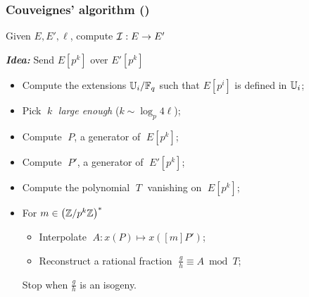 \documentclass[10pt,usepdftitle=false]{beamer}
\begin{document}

\begin{frame}
  \frametitle{Couveignes' algorithm (\cite{couveignes96})}
  
  \begin{center}
    \large
    Given $E, E', \ell$, compute $\mathcal{I}:E\to E'$
  \end{center}

  \begin{center}
    \emph{\textbf{Idea:}} Send $E[p^k]$ over $E'[p^k]$
  \end{center}
  
  \begin{itemize}
  \item Compute the extensions $\mathbb{U}_i/\mathbb{F}_q$ such that $E[p^i]$ is
    defined in $\mathbb{U}_i$;
  \item Pick $\;k\;$ \emph{large enough} ($k\sim\log_p4\ell$);
  \item Compute $\;P$, a generator of $\;E[p^k]$;
  \item Compute $\;P'$, a generator of $\;E'[p^k]$;
  \item Compute the polynomial $\;T\;$ vanishing on $\;E[p^k]$;
  \item For $m\in\left(\mathbb{Z}/p^k\mathbb{Z}\right)^\ast$
    \begin{itemize}
      \normalsize
    \item Interpolate $\;A : x(P) \mapsto x([m]P')$;
    \item Reconstruct a rational fraction  $\;\frac{g}{h}\equiv A \bmod T$;
    \end{itemize}
    \alert<3>{Stop when $\frac{g}{h}$ is an isogeny.}
  \end{itemize}
\end{frame}

\end{document}
